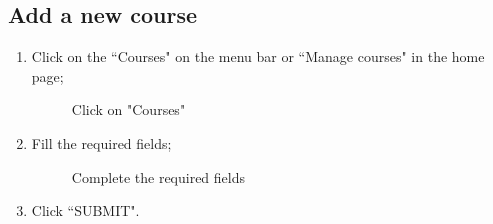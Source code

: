 \documentclass[ManualeUtente]{subfiles}
\begin{document}
\subsection{Add a new course}
\begin{enumerate}
	\item Click on the \textquotedblleft Courses" on the menu bar or \textquotedblleft Manage courses" in the home page;
	\begin{figure}[H]
		\centering
		\caption{Click on "Courses"}
		\label{fig:Click on "Courses"}
	\end{figure}
	\item Fill the required fields;
	\begin{figure}[H]
		\centering
		\caption{Complete the required fields}
		\label{fig:Complete the required fields}
	\end{figure}
	\item Click \textquotedblleft SUBMIT".

\end{enumerate}
\end{document}
